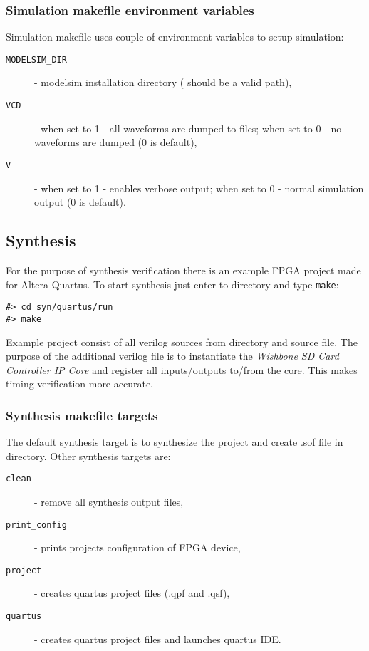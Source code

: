     \subsubsection{Simulation makefile environment variables}
    \label{sec:sim_make_var}
    
    Simulation makefile uses couple of environment variables to setup simulation:
    \begin{description}
    \item[\texttt{MODELSIM\_DIR}] - modelsim installation directory ( should be a valid path),
    \item[\texttt{VCD}] - when set to 1 - all waveforms are dumped to  files; when set to 0 - no waveforms are dumped (0 is default),
    \item[\texttt{V}] - when set to 1 - enables verbose output; when set to 0 - normal simulation output (0 is default).
    \end{description}

    
    \subsection{Synthesis}
    \label{sec:synthesis}
    
    For the purpose of synthesis verification there is an example FPGA project made for Altera Quartus.
    To start synthesis just enter to  directory and type \texttt{make}:
    \begin{verbatim}
#> cd syn/quartus/run
#> make
    \end{verbatim}
    Example project consist of all verilog sources from  directory and  source file. 
    The purpose of the additional verilog file is to instantiate the \textit{Wishbone SD Card Controller IP Core} and register all inputs/outputs to/from the core.
    This makes timing verification more accurate.
    
    \subsubsection{Synthesis makefile targets}
    \label{sec:syn_make_targ}
    
    The default synthesis target is to synthesize the project and create .sof file in  directory. Other synthesis targets are:
    \begin{description}
    \item[\texttt{clean}] - remove all synthesis output files,
    \item[\texttt{print\_config}] - prints projects configuration of FPGA device,
    \item[\texttt{project}] - creates quartus project files (.qpf and .qsf),
    \item[\texttt{quartus}] - creates quartus project files and launches quartus IDE.
    \end{description}
    
